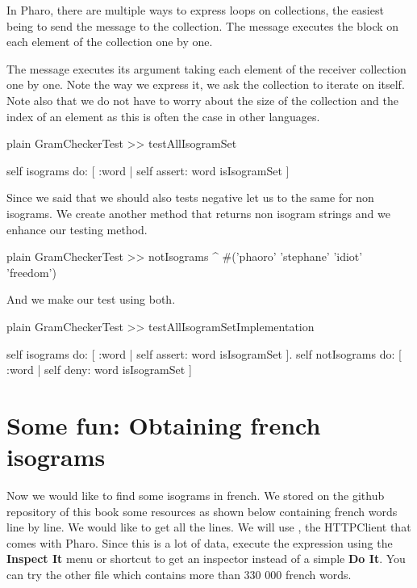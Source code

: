 \documentclass[10pt,twoside,english]{_support/latex/sbabook/sbabook}
\begin{document}
In Pharo, there are multiple ways to express loops on collections, the easiest being to send the message  to the collection. The  message executes the block on each element of the collection one by one.

\begin{coffee}
The  message executes its argument taking each element of the receiver collection one by one. Note the way we express it, we ask the collection to iterate on itself. Note also that we do not have to worry about the size of the collection and the index of an element as this is often the case in other languages.
\end{coffee}

\begin{displaycode}{plain}
GramCheckerTest >> testAllIsogramSet
	
	self isograms do: [ :word |
		self assert: word isIsogramSet ]
\end{displaycode}

Since we said that we should also tests negative let us to the same for non isograms. We create another method that returns non isogram strings and we enhance our testing method. 

\begin{displaycode}{plain}
GramCheckerTest >> notIsograms
	^ #('phaoro' 'stephane' 'idiot' 'freedom')
\end{displaycode}

And we make our test using both. 

\begin{displaycode}{plain}
GramCheckerTest >> testAllIsogramSetImplementation
	
	self isograms do: [ :word |
		self assert: word isIsogramSet ].
	self notIsograms do: [ :word |
		self deny: word isIsogramSet ]
\end{displaycode}
\section{Some fun: Obtaining french isograms}
Now we would like to find some isograms in french. We stored on the github repository of this book some resources as shown below containing french words line by line. We would like to get all the lines. We will use , the HTTPClient that comes with Pharo.
 Since this is a lot of data, execute the expression using the \textbf{Inspect It} menu or shortcut to get an inspector instead of a simple \textbf{Do It}.
 You can try the other file which contains more than 330 000 french words.
\end{document}
